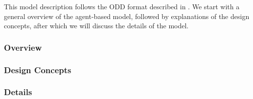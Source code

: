 
This model description follows the ODD format described in \textcite{grimm2006standard}. We start with a general overview of the agent-based model, followed by explanations of the design concepts, after which we will discuss the details of the model. 


\subsubsection{Overview}
\label{subsub:method:model:overview}


\subsubsection{Design Concepts}
\label{subsub:method:model:design}


\subsubsection{Details}
\label{subsub:method:model:details}
